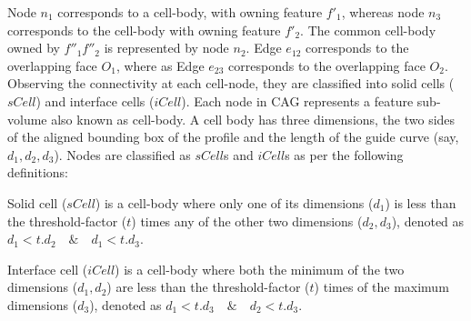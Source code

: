 Node $n_1$ corresponds to a cell-body, with owning feature $f'_1$, whereas node $n_3$ corresponds to the cell-body with owning feature $f'_2$. The common cell-body owned by $ f''_1f''_2$ is represented by node $n_2$.  Edge $e_{12}$ corresponds to the overlapping face $O_1$, where as  Edge $e_{23}$ corresponds to the overlapping face $O_2$.
Observing the connectivity at each cell-node, they are classified into solid cells ($sCell$) and interface cells ($iCell$). %
Each node in CAG represents a feature sub-volume also known as cell-body. A cell body has three dimensions, the two sides of the aligned bounding box of the profile and the length of the guide curve (say, $d_1,d_2,d_3$).
%
Nodes are classified as $sCell$s and $iCell$s as per the following definitions:
\begin{mydef}
\label{def:scell}
Solid cell ($sCell$) is a cell-body where only one of its dimensions ($d_1$) is less than the threshold-factor ($t$) times any of the other two dimensions ($d_2, d_3$), denoted as  $d_1 < t.d_2 \quad \&  \quad d_1 < t.d_3$. %
\end{mydef}
\begin{mydef}
\label{def:icell}
Interface cell ($iCell$) is a cell-body where  both the minimum of the two dimensions ($d_1,d_2$)  are less than the threshold-factor ($t$) times of the maximum dimensions ($d_3$), denoted as  $d_1 < t.d_3 \quad \&  \quad d_2 < t.d_3$. %
\end{mydef}


